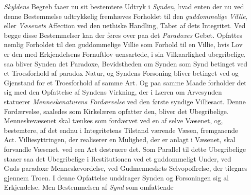 \emph{Skyldens} Begreb faaer nu sit bestemtere Udtryk i \emph{Synden}, hvad enten
der nu ved denne Bestemmelse udtrykkelig fremhæves Forholdet til den
\emph{guddommelige Villie}, eller \emph{Væsenets} Affection ved den uethiske
Handling,
 Tabet af dets Integritet. Ved begge disse Bestemmelser kan der føres over paa det
\emph{Paradoxes} Gebet. Opfattes nemlig Forholdet til den guddommelige Villie som
Forhold til en Villie, hvis Lov er den med Erkjendelsens Fornuftlov uensartede, i
sin Vilkaarlighed ubegribelige, saa bliver Synden det Paradoxe, Bevidstheden om
Synden som Synd betinget ved et Troesforhold af paradox Natur, og Syndens
Forsoning bliver betinget ved og Gjenstand for et Troesforhold af samme Art. Og
paa samme Maade forholder det sig med den Opfattelse af Syndens Virkning, der i
Læren om Arvesynden statuerer \emph{Menneskenaturens Fordærvelse} ved den første
syndige Villiesact. Denne Fordærvelse, saaledes som Kirkelæren opfatter den,
bliver det Ubegribelige. Menneskevæsenet skal tænkes som fordærvet ved en af
selve Væsenet, og, bestemtere, af det endnu i Integritetens Tilstand værende
Væsen, fremgaaende Act. Villiesyttringen, der realiserer en Mulighed, der er
anlagt i Væsenet, skal forvandle Væsenet, ved een Act destruere det. Som Parallel
til dette Ubegribelige staaer saa det Ubegribelige i Restitutionen ved et
guddommeligt Under, ved Guds paradoxe Menneskevordelse, ved Gudmenneskets
Selvopoffrelse, der tilegnes gjennem Troen. I denne Opfattelse unddrager Synden
og Forsoningen sig al Erkjendelse. Men Bestemmelsen af \emph{Synd} som omfattende
